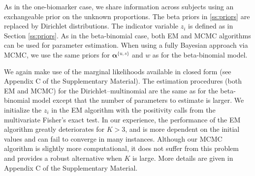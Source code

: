 \documentclass[12pt,oupdraft]{biostatistics}
\begin{document}
As in the one-biomarker case, we share information across subjects using an exchangeable prior on the unknown proportions. The beta priors in  \ref{ss:priors} are replaced by Dirichlet distributions.
The indicator variable $z_i$ is defined as in Section \ref{ss:priors}. As in the beta-binomial case, both EM and MCMC algorithms can be used for parameter estimation. When using a fully Bayesian approach via MCMC, we use the same priors for $\boldsymbol{\alpha}^{\{u,s\}}$ and $w$ as for the beta-binomial model.

We again make use of the marginal likelihoods available in closed form (see Appendix C of the Supplementary Material). 
The estimation procedures (both EM and MCMC) for the Dirichlet--multinomial are the same as for the beta-binomial model except that the number of parameters to estimate is larger. We initialize the $z_i$ in the EM algorithm with the positivity calls from the multivariate Fisher's exact test. In our experience, the performance of the EM algorithm greatly deteriorates for $K>3$, and is more dependent on the initial values and can fail to converge in many instances. Although our MCMC algorithm is slightly more computational, it does not suffer from this problem and provides a robust alternative when $K$ is large. More details are given in Appendix C of the Supplementary Material.
\end{document}
